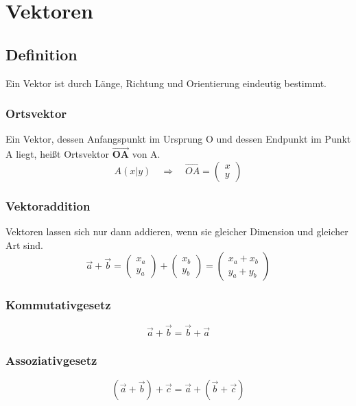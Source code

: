 \section*{Vektoren}
\begin{multicols}{3}
\subsection*{Definition}
Ein Vektor ist durch Länge, Richtung und Orientierung eindeutig bestimmt.
\subsubsection*{Ortsvektor}
Ein Vektor, dessen Anfangspunkt im Ursprung O und dessen Endpunkt im Punkt A liegt, heißt Ortsvektor $\boldsymbol{\overrightarrow{OA}}$
von A.
\begin{equation*}
    A(x|y) \quad \Rightarrow \quad \overrightarrow{OA} = \begin{pmatrix} x \\ y \end{pmatrix}
\end{equation*}

\subsubsection*{Vektoraddition}
Vektoren lassen sich nur dann addieren, wenn sie gleicher Dimension und gleicher Art sind.
\begin{equation*}
    \vec{a}+\vec{b} = \begin{pmatrix} x_a \\ y_a\end{pmatrix}+\begin{pmatrix} x_b \\ y_b\end{pmatrix} = \begin{pmatrix} x_a+x_b \\ y_a+y_b\end{pmatrix}
\end{equation*}
\subsubsection*{Kommutativgesetz}
\begin{equation*}
    \vec{a}+\vec{b} = \vec{b}+\vec{a}
\end{equation*}
\subsubsection*{Assoziativgesetz}
\begin{equation*}
    (\vec{a}+\vec{b}) + \vec{c} = \vec{a} + (\vec{b}+\vec{c})
\end{equation*}


\end{multicols}
